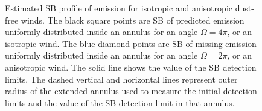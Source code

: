 \documentclass[twocolumn]{aastex61}
\begin{document}
\begin{figure}[h]
\centering
{}
\caption{Estimated SB profile of  emission for isotropic and anisotropic dust-free winds. The black square points are SB of predicted  emission uniformly distributed inside an annulus for an angle $\Omega=4\pi$, or an isotropic wind. The blue diamond points are SB of missing  emission uniformly distributed inside an annulus for an angle $\Omega=2\pi$, or an anisotropic wind. The solid line shows the value of the SB detection limits. The dashed vertical and horizontal lines represent outer radius of the extended annulus used to measure the initial detection limits and the value of the SB detection limit in that annulus.}
\label{fig.emission}
\end{figure}


\end{document}
